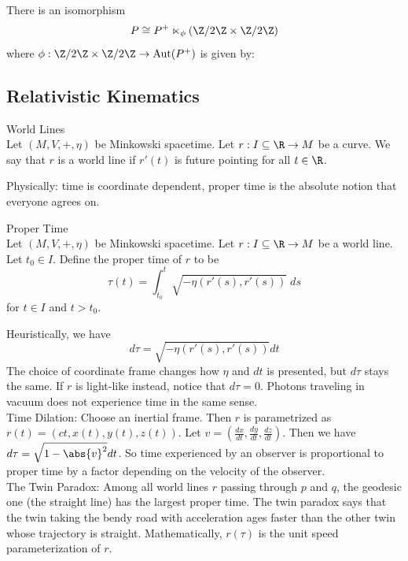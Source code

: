 \documentclass[a4paper]{article}
\begin{document}
\begin{prp}{}{}\\
There is an isomorphism $$P\cong P^+\ltimes_\phi(\Z/2\Z\times\Z/2\Z)$$ where $\phi:\Z/2\Z\times\Z/2\Z\to\text{Aut}(P^+)$ is given by: 
\end{prp}

\subsection{Relativistic Kinematics}
\begin{defn}{World Lines}{}\\
Let $(M,V,+,\eta)$ be Minkowski spacetime. Let $r:I\subseteq\R\to M$ be a curve. We say that $r$ is a world line if $r'(t)$ is future pointing for all $t\in\R$. 
\end{defn}

Physically: time is coordinate dependent, proper time is the absolute notion that everyone agrees on. 

\begin{defn}{Proper Time}{}\\
Let $(M,V,+,\eta)$ be Minkowski spacetime. Let $r:I\subseteq\R\to M$ be a world line. Let $t_0\in I$. Define the proper time of $r$ to be $$\tau(t)=\int_{t_0}^t\sqrt{-\eta(r'(s),r'(s))}\;ds$$ for $t\in I$ and $t>t_0$. 
\end{defn}

Heuristically, we have $$d\tau=\sqrt{-\eta(r'(s),r'(s))}dt$$ The choice of coordinate frame changes how $\eta$ and $dt$ is presented, but $d\tau$ stays the same. If $r$ is light-like instead, notice that $d\tau=0$. Photons traveling in vacuum does not experience time in the same sense. \\

Time Dilation: Choose an inertial frame. Then $r$ is parametrized as $r(t)=(ct,x(t),y(t),z(t))$. Let $v=\left(\frac{dx}{dt},\frac{dy}{dt},\frac{dz}{dt}\right)$. Then we have $d\tau=\sqrt{1-\abs{v}^2}dt$. So time experienced by an observer is proportional to proper time by a factor depending on the velocity of the observer. \\

The Twin Paradox: Among all world lines $r$ passing through $p$ and $q$, the geodesic one (the straight line) has the largest proper time. The twin paradox says that the twin taking the bendy road with acceleration ages faster than the other twin whose trajectory is straight. Mathematically, $r(\tau)$ is the unit speed parameterization of $r$. 
\end{document}
